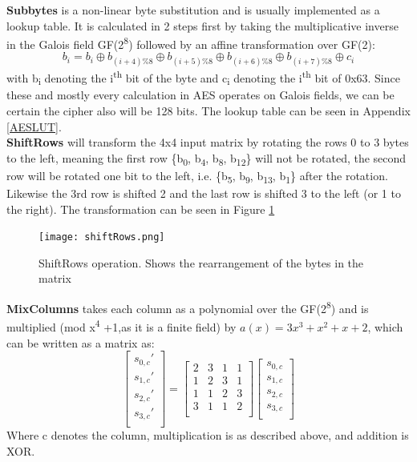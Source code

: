 \documentclass[a4paper, openany]{book}
\begin{document}
\textbf{Subbytes} is a non-linear byte substitution and is usually implemented as a lookup table. It is calculated in 2 steps first by taking the multiplicative inverse in the Galois field GF(2\textsuperscript{8}) followed by an affine transformation over GF(2):
\[b_i = b_i \oplus b_{(i+4) \% 8} \oplus b_{(i+5) \% 8} \oplus b_{(i+6) \% 8} \oplus b_{(i+7) \% 8} \oplus c_i \] with b\textsubscript{i} denoting the i\textsuperscript{th} bit of the byte and c\textsubscript{i} denoting the i\textsuperscript{th} bit of 0x63. Since these and mostly every calculation in AES operates on Galois fields, we can be certain the cipher also will be 128 bits. The lookup table can be seen in Appendix \ref{AESLUT}.\\

\textbf{ShiftRows} will transform the 4x4 input matrix by rotating the rows 0 to 3 bytes to the left, meaning the first row \{b\textsubscript{0}, b\textsubscript{4}, b\textsubscript{8}, b\textsubscript{12}\} will not be rotated, the second row will be rotated one bit to the left, i.e. \{b\textsubscript{5}, b\textsubscript{9}, b\textsubscript{13}, b\textsubscript{1}\} after the rotation. Likewise the 3rd row is shifted 2 and the last row is shifted 3 to the left (or 1 to the right). The transformation can be seen in Figure \ref{fig:ShiftRows}


\begin{figure}[!htb]
\centering
\texttt{[image: shiftRows.png]}
\caption[ShiftRows operation]{ShiftRows operation. Shows the rearrangement of the bytes in the matrix}
\label{fig:ShiftRows}
\end{figure}

\textbf{MixColumns} takes each column as a polynomial over the GF(2\textsuperscript{8}) and is multiplied (mod x\textsuperscript{4} +1,as it is a finite field) by \(a(x) = 3x^3 + x^2 + x + 2\), which can be written as a matrix as:
\[
\begin{bmatrix}
 s_{0,c}' \\
 s_{1,c}' \\
 s_{2,c}' \\
 s_{3,c}' \\
\end{bmatrix}=
\begin{bmatrix}
 2 & 3 & 1 & 1 \\
 1 & 2 & 3 & 1 \\
 1 & 1 & 2 & 3 \\
 3 & 1 & 1 & 2 \\
\end{bmatrix}
\begin{bmatrix}
 s_{0,c} \\
 s_{1,c} \\
 s_{2,c} \\
 s_{3,c} \\
\end{bmatrix}
\]
Where c denotes the column, multiplication is as described above, and addition is XOR.
\end{document}
